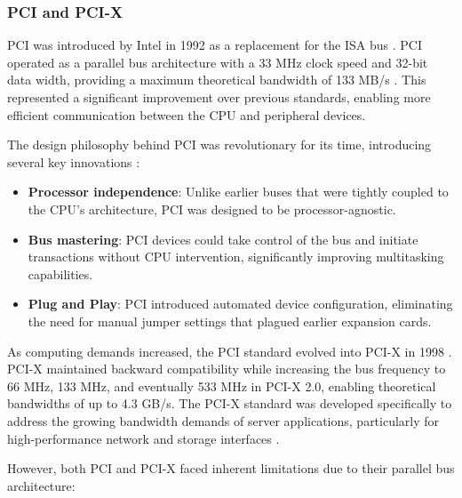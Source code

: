 \subsubsection{PCI and PCI-X}
\label{subsubsec:pcie_pci_pcix}

\ac{PCI} was introduced by Intel in 1992 as a replacement for the \ac{ISA} 
bus \parencite{anderson1999pci}. \ac{PCI} operated as a parallel 
bus architecture with a 33 MHz clock speed and 32-bit data width, providing 
a maximum theoretical bandwidth of 133 MB/s \parencite{shanley2000pcix}. 
This represented a significant improvement over previous standards, enabling more 
efficient communication between the \ac{CPU} and peripheral devices.

The design philosophy behind \ac{PCI} was revolutionary for its time, introducing 
several key innovations \parencite[pp. 11, 92-105, 189]{abbott2003pci}:

\begin{itemize}
    \item \textbf{Processor independence}: Unlike earlier buses that were tightly 
    coupled to the CPU's architecture, PCI was designed to be processor-agnostic.
    \item \textbf{Bus mastering}: PCI devices could take control of the bus and 
    initiate transactions without CPU intervention, significantly improving multitasking capabilities.
    \item \textbf{Plug and Play}: PCI introduced automated device configuration, 
    eliminating the need for manual jumper settings that plagued earlier expansion cards.
\end{itemize}

As computing demands increased, the \ac{PCI} standard evolved into \ac{PCI-X} in 
1998 \parencite{shanley2000pcix}. \ac{PCI-X} maintained backward compatibility 
while increasing the bus frequency to 66 MHz, 133 MHz, and eventually 533 MHz in 
\ac{PCI-X} 2.0, enabling theoretical bandwidths of up to 4.3 GB/s. The \ac{PCI-X} 
standard was developed specifically to address the growing bandwidth demands of 
server applications, particularly for high-performance network and storage 
interfaces \parencite{shanley2000pcix}.

However, both \ac{PCI} and \ac{PCI-X} faced inherent limitations due to their parallel bus architecture:

